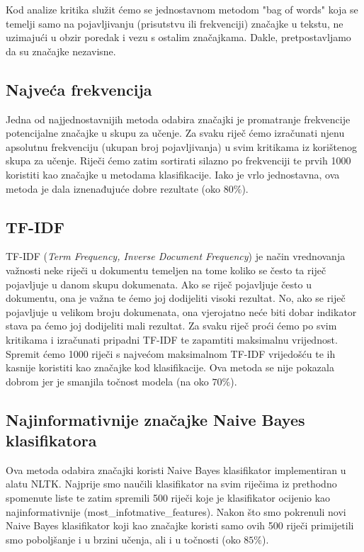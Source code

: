 \documentclass[conference]{IEEEtran}
\begin{document}
Kod analize kritika služit ćemo se jednostavnom metodom "bag of words" koja se temelji samo na pojavljivanju (prisutstvu ili frekvenciji) značajke u tekstu, ne uzimajući u obzir poredak i vezu s ostalim značajkama. Dakle, pretpostavljamo da su značajke nezavisne.

\subsection{Najveća frekvencija}

Jedna od najjednostavnijih metoda odabira značajki je promatranje frekvencije potencijalne značajke u skupu za učenje. Za svaku riječ ćemo izračunati njenu apsolutnu frekvenciju (ukupan broj pojavljivanja) u svim kritikama iz korištenog skupa za učenje. Riječi ćemo zatim sortirati silazno po frekvenciji te prvih 1000 koristiti kao značajke u metodama klasifikacije. Iako je vrlo jednostavna, ova metoda je dala iznenađujuće dobre rezultate (oko $80\%$).

\subsection{TF-IDF}

TF-IDF (\textit{Term Frequency, Inverse Document Frequency}) je način vrednovanja važnosti neke riječi u dokumentu temeljen na tome koliko se često ta riječ pojavljuje u danom skupu dokumenata. Ako se riječ pojavljuje često u dokumentu, ona je važna te ćemo joj dodijeliti visoki rezultat. No, ako se riječ pojavljuje u velikom broju dokumenata, ona vjerojatno neće biti dobar indikator stava pa ćemo joj dodijeliti mali rezultat. Za svaku riječ proći ćemo po svim kritikama i izračunati pripadni TF-IDF te zapamtiti maksimalnu vrijednost. Spremit ćemo 1000 riječi s najvećom maksimalnom TF-IDF vrijedošću te ih kasnije koristiti kao značajke kod klasifikacije. Ova metoda se nije pokazala dobrom jer je smanjila točnost modela (na oko $70\%$).

\subsection{Najinformativnije značajke Naive Bayes klasifikatora}

Ova metoda odabira značajki koristi Naive Bayes klasifikator implementiran u alatu NLTK. Najprije smo naučili klasifikator na svim riječima iz prethodno spomenute liste te zatim spremili 500 riječi koje je klasifikator ocijenio kao najinformativnije (most\_infotmative\_features). Nakon što smo pokrenuli novi Naive Bayes klasifikator koji kao značajke koristi samo ovih 500 riječi primijetili smo poboljšanje i u brzini učenja, ali i u točnosti (oko $85\%$).
\end{document}
